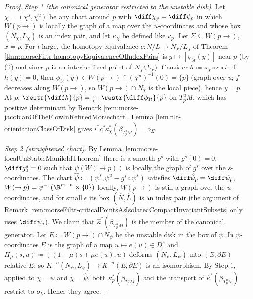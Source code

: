 \begin{proof}
	\emph{Step 1 (the canonical generator restricted to the unstable disk).} Let $\chi=(\chi^s,\chi^u)$ be any chart around $p$ with $\diff\chi_p=\diff\psi_p$ in which $W(p\to)$ is locally the graph of a map over the $u$-coordinates and whose box $(N_\chi,L_\chi)$ is an index pair, and let $\kappa_\chi$ be defined like $\kappa_p$. Let $\Sigma\subseteq W(p\to)$, $x=p$. For $t$ large, the homotopy equivalence $c:N/L\to N_\chi/L_\chi$ of Theorem \ref{thm:morseFiltr-homotopyEquivalenceOfIndexPairs} is $y\mapsto[\phi_{3t}(y)]$ near $p$ (by (ii) and since $p$ is an interior fixed point of $N_\chi\setminus L_\chi$). Consider $h\coloneq\kappa_\chi\circ c\circ i$. If $h(y)=0$, then $\phi_{3t}(y)\in W(p\to)\cap(\chi^u)^{-1}(0)=\{p\}$ (graph over $u$; $f$ decreases along $W(p\to)$, so $W(p\to)\cap N_\chi$ is the local piece), hence $y=p$. At $p$, $\restr{\diff h}{p}=\frac1\epsilon\cdot\restr{\diff\phi_{3t}}{p}$ on $T^u_pM$, which has positive determinant by Remark \ref{rem:morse-jacobianOfTheFlowInRefinedMorsechart}. Lemma \ref{lem:filt-orientationClassOfDisk} gives $i^*c^*\kappa_\chi^*(\beta_{T^u_pM})=o_\Sigma$.
	
	\emph{Step 2 (straightened chart).} By Lemma \ref{lem:morse-localUnStableManifoldTheorem} there is a smooth $g^s$ with $g^s(0)=0$, $\diff g^s_0=0$ such that $\psi(W(\to p))$ is locally the graph of $g^s$ over the $s$-coordinates. The chart $\hat\psi\coloneq(\psi^s,\psi^u-g^s\circ\psi^s)$ satisfies $\diff\hat\psi_p=\diff\psi_p$, $W(\to p)=\hat\psi^{-1}(\R^{m-n}\times\{0\})$ locally, $W(p\to)$ is still a graph over the $u$-coordinates, and for small $\epsilon$ its box $(\hat N,\hat L)$ is an index pair (the argument of Remark \ref{rem:morseFiltr-criticalPointsAsIsolatedCompactInvariantSubsets} only uses $\diff\psi_p$). We claim that $\hat\kappa^*(\beta_{T^u_pM})$ is the member of the canonical generator. Let $E\coloneq W(p\to)\cap N_\psi$ be the unstable disk in the box of $\psi$. In $\psi$-coordinates $E$ is the graph of a map $u\mapsto e(u)\in D^s_\epsilon$ and $H_\mu(s,u)\coloneq((1-\mu)s+\mu e(u),u)$ deforms $(N_\psi,L_\psi)$ into $(E,\partial E)$ relative $E$; so $K^{-n}(N_\psi,L_\psi)\to K^{-n}(E,\partial E)$ is an isomorphism. By Step 1, applied to $\chi=\psi$ and $\chi=\hat\psi$, both $\kappa_p^*(\beta_{T^u_pM})$ and the transport of $\hat\kappa^*(\beta_{T^u_pM})$ restrict to $o_E$. Hence they agree.
	

\end{proof}
